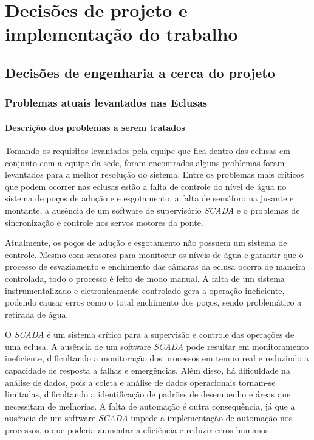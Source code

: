 \part{Decisões de projeto e implementação do trabalho}

\chapter[Decisões de engenharia a cerca do projeto]{Decisões de engenharia a cerca do projeto}

\section{Problemas atuais levantados nas Eclusas}

\subsection{Descrição dos problemas a serem tratados}

Tomando os requisitos levantados pela equipe que fica dentro das eclusas em conjunto com a equipe da sede, foram encontrados alguns problemas foram levantados para a melhor resolução do sistema. Entre os problemas mais críticos que podem ocorrer nas eclusas estão a falta de controle do nível de água no sistema de poços de adução e e esgotamento, a falta de semáforo na jusante e montante, a ausência de um software de supervisório \textit{SCADA} e o problemas de sincronização e controle nos servos motores da ponte.

Atualmente, os poços de adução e esgotamento não possuem um sistema de controle. Mesmo com sensores para monitorar os níveis de água e garantir que o processo de esvaziamento e enchimento das câmaras da eclusa ocorra de maneira controlada, todo o processo é feito de modo manual. A falta de um sistema instrumentalizado e eletronicamente controlado gera a operação ineficiente, podendo causar erros como o total enchimento dos poços, sendo problemático a retirada de água. 

O \textit{SCADA} é um sistema crítico para a supervisão e controle das operações de uma eclusa. A ausência de um software \textit{SCADA }pode resultar em monitoramento ineficiente, dificultando a monitoração dos processos em tempo real e reduzindo a capacidade de resposta a falhas e emergências. Além disso, há dificuldade na análise de dados, pois a coleta e análise de dados operacionais tornam-se limitadas, dificultando a identificação de padrões de desempenho e áreas que necessitam de melhorias. A falta de automação é outra consequência, já que a ausência de um software \textit{SCADA} impede a implementação de automação nos processos, o que poderia aumentar a eficiência e reduzir erros humanos.

